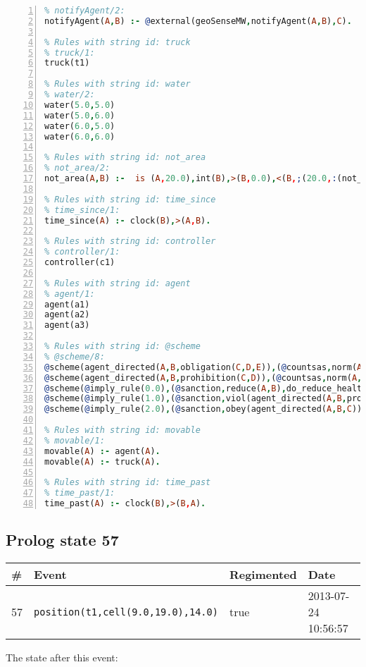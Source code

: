 \documentclass[11pt]{article}\usepackage[utf8]{inputenc}\usepackage{geometry}
\begin{document}
\begin{lstlisting}[language=Prolog, numbers=left]
% Rules with string id: notifyAgent
% notifyAgent/2:
notifyAgent(A,B) :- @external(geoSenseMW,notifyAgent(A,B),C).

% Rules with string id: truck
% truck/1:
truck(t1)

% Rules with string id: water
% water/2:
water(5.0,5.0)
water(5.0,6.0)
water(6.0,5.0)
water(6.0,6.0)

% Rules with string id: not_area
% not_area/2:
not_area(A,B) :-  is (A,20.0),int(B),>(B,0.0),<(B,;(20.0,:(not_area(A,B), is (-(B),20.0)))),int(A),>(A,0.0),<(A,;(20.0,:(area(A,B),-(int(A))))),int(B),>(A,0.0),>(B,0.0),<(A,21.0),<(B,21.0).

% Rules with string id: time_since
% time_since/1:
time_since(A) :- clock(B),>(A,B).

% Rules with string id: controller
% controller/1:
controller(c1)

% Rules with string id: agent
% agent/1:
agent(a1)
agent(a2)
agent(a3)

% Rules with string id: @scheme
% @scheme/8:
@scheme(agent_directed(A,B,obligation(C,D,E)),(@countsas,norm(A,B,F,obligation(C,D,E)),F),false,(listTrue(C)),(time_past(D)),false,[plus(viol(agent_directed(A,B,obligation(C,D,E))))|[]],[plus(obey(agent_directed(A,B,obligation(C,D,E))))|[]])
@scheme(agent_directed(A,B,prohibition(C,D)),(@countsas,norm(A,B,E,prohibition(C,D)),E),(listTrue(C)),false,(false),false,[plus(viol(agent_directed(A,B,prohibition(C,D))))|[]],[plus(obey(agent_directed(A,B,prohibition(C,D))))|[]])
@scheme(@imply_rule(0.0),(@sanction,reduce(A,B),do_reduce_health(A,B),notifyAgent(A,changed(status))),true,false,false,false,[min(reduce(A,B))|[]],[])
@scheme(@imply_rule(1.0),(@sanction,viol(agent_directed(A,B,prohibition(C,D))),do_sanction(D)),true,false,false,false,[min(viol(agent_directed(A,B,prohibition(C,D))))|[]],[])
@scheme(@imply_rule(2.0),(@sanction,obey(agent_directed(A,B,C))),true,false,false,false,[min(obey(agent_directed(A,B,C)))|[]],[])

% Rules with string id: movable
% movable/1:
movable(A) :- agent(A).
movable(A) :- truck(A).

% Rules with string id: time_past
% time_past/1:
time_past(A) :- clock(B),>(B,A).

\end{lstlisting}
\clearpage 
\subsection{Prolog state 57}
\begin{table}[ht]
\centering 
\begin{tabular}{l l l l} 
\textbf{\#} & \textbf{Event} & \textbf{Regimented} & \textbf{Date} \\ [0.5ex] 
\hline
57&\texttt{position(t1,cell(9.0,19.0),14.0)}&true&2013-07-24 10:56:57\\ [1ex] \hline\end{tabular}
\end{table}
The state after this event:
\end{document}

